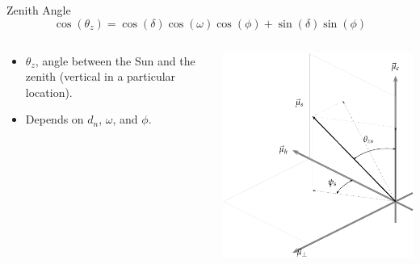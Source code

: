 \documentclass[xcolor={usenames,svgnames,dvipsnames}]{beamer}
\begin{document}
\begin{frame}[plain,label={sec:org153f8e2}]{Zenith Angle}
\[
\cos(\theta_{z}) = \cos(\delta) \cos(\omega) \cos(\phi) + \sin(\delta) \sin(\phi)
\]


\begin{columns}
\begin{column}{0.55\columnwidth}
\begin{itemize}
\item \(\theta_z\), angle between the Sun and the zenith (vertical in a particular location).
\item Depends on \(d_n\), \(\omega\), and \(\phi\).
\end{itemize}
\end{column}
\begin{column}{0.8\columnwidth}
\begin{center}
\includegraphics[width=.9\linewidth]{../figs/SistemaCoordenadasLocal-crop.pdf}
\end{center}
\end{column}
\end{columns}
\end{frame}
\end{document}
